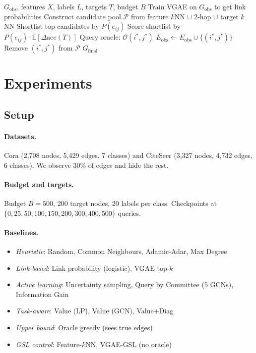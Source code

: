 \documentclass{article}
\begin{document}
\begin{algorithm}
\caption{Task-Aware Active Edge Querying}
\begin{algorithmic}[1]
\REQUIRE $G_\mathrm{obs}$, features $X$, labels $L$, targets $T$, budget $B$
\STATE Train VGAE on $G_\mathrm{obs}$ to get link probabilities
\STATE Construct candidate pool $\mathcal{P}$ from feature $k$NN $\cup$ 2-hop $\cup$ target $k$NN
    \STATE Shortlist top candidates by $P(e_{ij})$
    \STATE Score shortlist by $P(e_{ij}) \cdot \mathbb{E}[\Delta\mathrm{acc}(T)]$
    \STATE Query oracle: $\mathcal{O}(i^*, j^*)$
        \STATE $E_\mathrm{obs} \leftarrow E_\mathrm{obs} \cup \{(i^*, j^*)\}$
    \ENDIF
    \STATE Remove $(i^*, j^*)$ from $\mathcal{P}$
\ENDFOR
\RETURN $G_\mathrm{final}$
\end{algorithmic}
\end{algorithm}


\section{Experiments}
\label{sec:experiments}

\subsection{Setup}

\paragraph{Datasets.}
Cora (2,708 nodes, 5,429 edges, 7 classes) and CiteSeer (3,327 nodes, 4,732 edges, 6 classes).
We observe 30\% of edges and hide the rest.

\paragraph{Budget and targets.}
Budget $B = 500$, 200 target nodes, 20 labels per class.
Checkpoints at $\{0, 25, 50, 100, 150, 200, 300, 400, 500\}$ queries.

\paragraph{Baselines.}
\begin{itemize}
    \item \emph{Heuristic}: Random, Common Neighbours, Adamic-Adar, Max Degree
    \item \emph{Link-based}: Link probability (logistic), VGAE top-$k$
    \item \emph{Active learning}: Uncertainty sampling, Query by Committee (5 GCNs), Information Gain
    \item \emph{Task-aware}: Value (LP), Value (GCN), Value+Diag
    \item \emph{Upper bound}: Oracle greedy (sees true edges)
    \item \emph{GSL control}: Feature-$k$NN, VGAE-GSL (no oracle)
\end{itemize}
\end{document}
